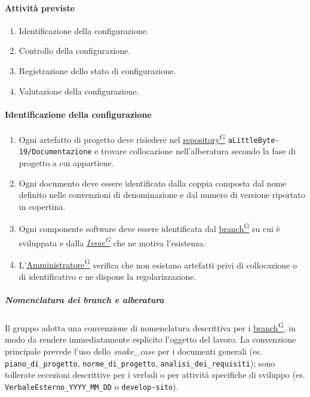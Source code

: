 \documentclass[a4paper,12pt]{article}
\providecommand{\glslink}[2]{\href{https://alittlebyte-19.github.io/Documentazione/glossario.html\#gls-#1}{\underline{#2}\textsuperscript{\scriptsize G}}}
\begin{document}
\paragraph{Attività previste}
\begin{enumerate}
    \item Identificazione della configurazione.
    \item Controllo della configurazione.
    \item Registrazione dello stato di configurazione.
    \item Valutazione della configurazione.
\end{enumerate}

\paragraph{Identificazione della configurazione}
\begin{enumerate}
    \item Ogni artefatto di progetto deve risiedere nel \glslink{repository}{repository} \texttt{aLittleByte-19/Documentazione} e trovare collocazione nell'alberatura secondo la fase di progetto a cui appartiene.
    \item Ogni documento deve essere identificato dalla coppia composta dal nome definito nelle convenzioni di denominazione e dal numero di versione riportato in copertina.
    \item Ogni componente software deve essere identificata dal \glslink{branch}{branch} su cui è sviluppata e dalla \textit{\glslink{issue}{Issue}} che ne motiva l'esistenza.
    \item L'\glslink{amministratore}{Amministratore} verifica che non esistano artefatti privi di collocazione o di identificativo e ne dispone la regolarizzazione.
\end{enumerate}

\subparagraph{Nomenclatura dei branch e alberatura}
Il gruppo adotta una convenzione di nomenclatura descrittiva per i \glslink{branch}{branch}, in modo da rendere immediatamente esplicito l'oggetto del lavoro. La convenzione principale prevede l'uso dello \textit{snake\_case} per i documenti generali (es. \texttt{piano\_di\_progetto}, \texttt{norme\_di\_progetto}, \texttt{analisi\_dei\_requisiti}); sono tollerate eccezioni descrittive per i verbali o per attività specifiche di sviluppo (es. \texttt{VerbaleEsterno\_YYYY\_MM\_DD} o \texttt{develop-sito}).
\end{document}

